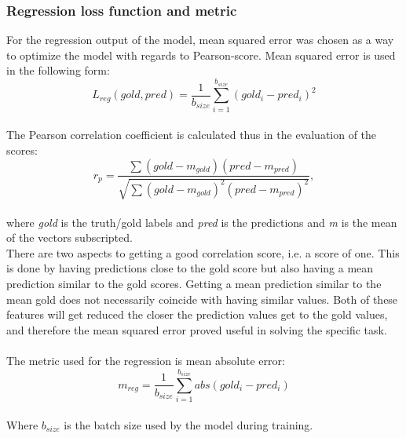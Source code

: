 \subsubsection{Regression loss function and metric}
For the regression output of the model, mean squared error was chosen as a way to optimize the model with regards to Pearson-score. Mean squared error is used in the following form:\\
\begin{equation} \label{eq:lreg}
L_{reg}(gold, pred)=\dfrac{1}{b_{size}}\sum^{b_{size}}_{i=1}\left(gold_{i}-pred_{i}\right)^{2}
\end{equation}\\
The Pearson correlation coefficient is calculated thus in the evaluation of the scores:\\
\begin{equation} \label{eq:pearson}
r_{p} = \dfrac{\sum \left(gold-m_{gold}\right) \left(pred-m_{pred}\right)}{\sqrt{\sum \left(gold-m_{gold}\right)^{2} \left(pred-m_{pred}\right)^{2}}},
\end{equation}\\
where \textit{gold} is the truth/gold labels and \textit{pred} is the predictions and \textit{m} is the mean of the vectors subscripted.\\
There are two aspects to getting a good correlation score, i.e. a score of one. This is done by having predictions close to the gold score but also having a mean prediction similar to the gold scores. Getting a mean prediction similar to the mean gold does not necessarily coincide with having similar values. Both of these features will get reduced the closer the prediction values get to the gold values, and therefore the mean squared error proved useful in solving the specific task.\\
\\
The metric used for the regression is mean absolute error:\\
\begin{equation} \label{eq:meanabs}
m_{reg}=\dfrac{1}{b_{size}}\sum^{b_{size}}_{i=1}abs\left(gold_{i}-pred_{i}\right)
\end{equation}\\
Where $b_{size}$ is the batch size used by the model during training. 

